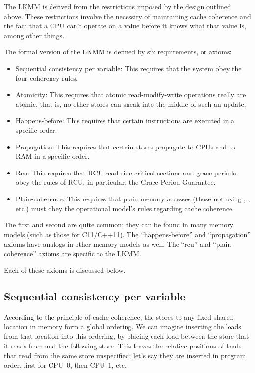 The LKMM is derived from the restrictions imposed by the design
outlined above.
These restrictions involve the necessity of maintaining cache
coherence and the fact that a CPU can't operate on a value before
it knows what that value is, among other things.

The formal version of the LKMM is defined by six requirements, or
axioms:

\begin{itemize}
\item	Sequential consistency per variable:
	This requires that the system obey the four coherency rules.

\item	Atomicity:
	This requires that atomic read-modify-write operations really
	are atomic, that is, no other stores can sneak into the
	middle of such an update.

\item	Happens-before:
	This requires that certain instructions are executed in a
	specific order.

\item	Propagation:
	This requires that certain stores propagate to CPUs and to
	RAM in a specific order.

\item	Rcu:
	This requires that RCU read-side critical sections and
	grace periods obey the rules of RCU, in particular, the
	Grace-Period Guarantee.

\item	Plain-coherence:
	This requires that plain memory accesses (those not using
	, , etc.\@) must obey
	the operational model's rules regarding cache coherence.
\end{itemize}

The first and second are quite common; they can be found in many
memory models (such as those for C11/C++11).
The ``happens-before'' and ``propagation'' axioms have analogs
in other memory models as well.
The ``rcu'' and ``plain-coherence'' axioms are specific to the LKMM\@.

Each of these axioms is discussed below.


\subsection{Sequential consistency per variable}
\label{sec:docs:explanation:Sequential consistency per variable}

According to the principle of cache coherence, the stores to any fixed
shared location in memory form a global ordering.
We can imagine inserting the loads from that location into this
ordering, by placing each load between the store that it reads from
and the following store.
This leaves the relative positions of loads that read from the same
store unspecified; let's say they are inserted in program order,
first for CPU~0, then CPU~1, etc.

